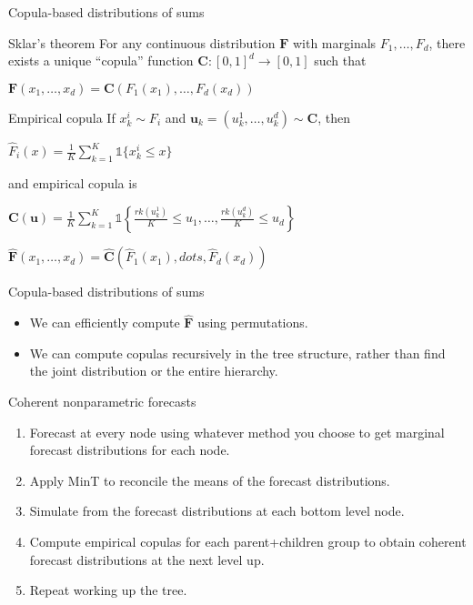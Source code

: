 \documentclass[14pt]{beamer}
\makeatletter
\def\biz{\begin{itemize}[<+-| alert@+>]}
\def\eiz{\end{itemize}}
\makeatother
\begin{document}
\begin{frame}{Copula-based distributions of sums}
\fontsize{14}{14}\sf
\begin{block}{Sklar's theorem}
For any continuous distribution $\bm{F}$ with marginals $F_1,\dots,F_d$, there exists a unique ``copula'' function $\bm{C}: [0,1]^d \rightarrow [0,1]$ such that

\centerline{$\bm{F}(x_1,\dots,x_d) = \bm{C}(F_1(x_1),\dots,F_d(x_d))$}
\end{block}
\begin{block}{Empirical copula}
If $x_k^i\sim F_i$ and $\bm{u}_k=(u_k^1,\dots,u_k^d)\sim \bm{C}$, then 
\centerline{$\hat{F}_i(x) = \frac{1}{K} \sum_{k=1}^K \mathds{1}\{x_k^i\le x\}$}
and empirical copula is
\centerline{$\bm{C}(\bm{u}) = \frac1K \sum_{k=1}^K \mathds{1}\left\{
  \frac{rk(u_k^1)}{K} \le u_1, \dots, \frac{rk(u_k^d)}{K} \le u_d\right\}
$}
\end{block}
\begin{alertblock}{}\centering
$\hat{\bm{F}}(x_1,\dots,x_d) = \hat{\bm{C}}(\hat{F}_1(x_1),dots,\hat{F}_d(x_d))$
\end{alertblock}
\end{frame}

\begin{frame}{Copula-based distributions of sums}
\biz
\item We can efficiently compute $\hat{\bm{F}}$ using permutations.
\item We can compute copulas recursively in the tree structure, rather than find the joint distribution or the entire hierarchy.
\eiz

\end{frame}

\begin{frame}{Coherent nonparametric forecasts}

\begin{enumerate}
\item Forecast at every node using whatever method you choose to get marginal forecast distributions for each node.
\item Apply MinT to reconcile the means of the forecast distributions.
\item  Simulate from the forecast distributions at each bottom level node.
\item Compute empirical copulas for each parent+children group to obtain coherent forecast distributions at the next level up.
\item Repeat working up the tree.
\end{enumerate}

\end{frame}
\end{document}
